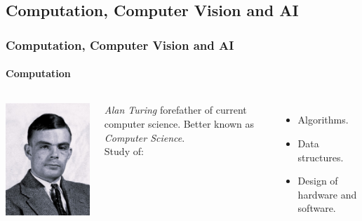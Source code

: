 \subsection*{Computation, Computer Vision and AI}
\begin{frame}[t]
    \frametitle{Computation, Computer Vision and AI}
    \framesubtitle{Computation}
    \begin{columns}[t]
        \begin{center}
            \includegraphics[width=.6\linewidth]{fig/intro/comp_cv_ai/img/turing.pdf}\\
        \end{center}
        {\small \emph{Alan Turing} forefather of current computer science.}
        Better known as \emph{Computer Science}.\\\vspace{10pt}
        \pause
        Study of:
        \begin{itemize}
            \item Algorithms.
            \item Data structures.
            \item Design of hardware and software.
        \end{itemize}
    \end{columns}
\end{frame}
